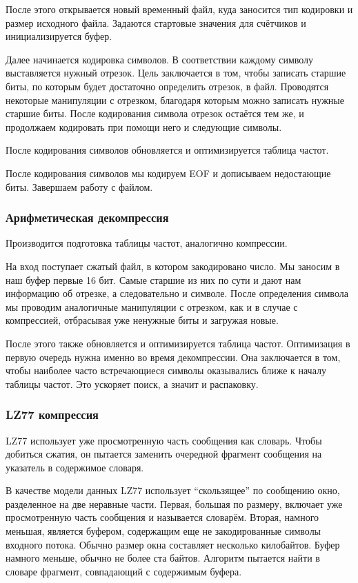 \documentclass[12pt]{article}
\begin{document}
После этого открывается новый временный файл, куда заносится тип кодировки и размер исходного файла. Задаются стартовые значения для счётчиков и инициализируется буфер. 

Далее начинается кодировка символов. В соответствии каждому символу выставляется нужный отрезок. Цель заключается в том, чтобы записать старшие биты, по которым будет достаточно определить отрезок, в файл. Проводятся некоторые манипуляции с отрезком, благодаря которым можно записать нужные старшие биты. После кодирования символа отрезок остаётся тем же, и продолжаем кодировать при помощи него и следующие символы.

После кодирования символов обновляется и оптимизируется таблица частот.

После кодирования символов мы кодируем EOF и дописываем недостающие биты. Завершаем работу с файлом.

\subsubsection*{Арифметическая декомпрессия}

Производится подготовка таблицы частот, аналогично компрессии.

На вход поступает сжатый файл, в котором закодировано число. Мы заносим в наш буфер первые 16 бит. Самые старшие из них по сути и дают нам информацию об отрезке, а следовательно и символе. После определения символа мы проводим аналогичные манипуляции с отрезком, как и в случае с компрессией, отбрасывая уже ненужные биты и загружая новые.

После этого также обновляется и оптимизируется таблица частот. Оптимизация в первую очередь нужна именно во время декомпрессии. Она заключается в том, чтобы наиболее часто встречающиеся символы оказывались ближе к началу таблицы частот. Это ускоряет поиск, а значит и распаковку.

\subsubsection*{LZ77 компрессия}

LZ77 использует уже просмотренную часть сообщения как словарь. Чтобы добиться сжатия, он пытается заменить очередной фрагмент сообщения на указатель в содержимое словаря.

В качестве модели данных LZ77 использует “скользящее” по сообщению окно, разделенное на две неравные части. Первая, большая по размеру, включает уже просмотренную часть сообщения и называется словарём. Вторая, намного меньшая, является буфером, содержащим еще не закодированные символы входного потока. Обычно размер окна составляет несколько килобайтов. Буфер намного меньше, обычно не более ста байтов. Алгоритм пытается найти в словаре фрагмент, совпадающий с содержимым буфера.
\end{document}
